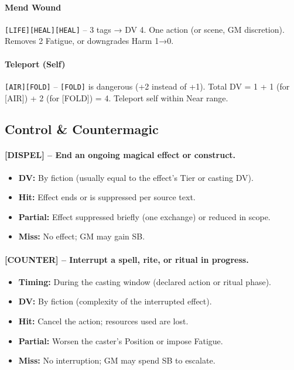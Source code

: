\paragraph{Mend Wound} \texttt{[LIFE][HEAL][HEAL]} – 3 tags → DV 4. One action (or scene, GM discretion). Removes 2 Fatigue, or downgrades Harm 1→0.

\paragraph{Teleport (Self)} \texttt{[AIR][FOLD]} – \texttt{[FOLD]} is dangerous (+2 instead of +1). Total DV = 1 + 1 (for [AIR]) + 2 (for [FOLD]) = 4. Teleport self within Near range.

\subsection{Control \& Countermagic}

\paragraph{[DISPEL] – End an ongoing magical effect or construct.}
\begin{itemize}
  \item \textbf{DV:} By fiction (usually equal to the effect's Tier or casting DV).
  \item \textbf{Hit:} Effect ends or is suppressed per source text.
  \item \textbf{Partial:} Effect suppressed briefly (one exchange) or reduced in scope.
  \item \textbf{Miss:} No effect; GM may gain SB.
\end{itemize}

\paragraph{[COUNTER] – Interrupt a spell, rite, or ritual in progress.}
\begin{itemize}
  \item \textbf{Timing:} During the casting window (declared action or ritual phase).
  \item \textbf{DV:} By fiction (complexity of the interrupted effect).
  \item \textbf{Hit:} Cancel the action; resources used are lost.
  \item \textbf{Partial:} Worsen the caster's Position or impose Fatigue.
  \item \textbf{Miss:} No interruption; GM may spend SB to escalate.
\end{itemize}

